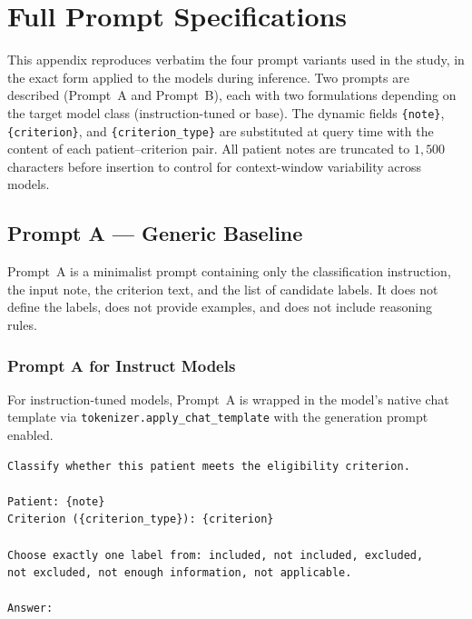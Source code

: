 
\chapter{Full Prompt Specifications}
\label{app:prompts}

This appendix reproduces verbatim the four prompt variants used in the 
study, in the exact form applied to the models during inference. Two 
prompts are described (Prompt~A and Prompt~B), each with two 
formulations depending on the target model class 
(instruction-tuned or base). The dynamic fields \texttt{\{note\}}, 
\texttt{\{criterion\}}, and \texttt{\{criterion\_type\}} are substituted 
at query time with the content of each patient--criterion pair. All 
patient notes are truncated to $1{,}500$ characters before insertion to 
control for context-window variability across models.

\section{Prompt A --- Generic Baseline}
\label{sec:app-prompt-a}

Prompt~A is a minimalist prompt containing only the classification 
instruction, the input note, the criterion text, and the list of 
candidate labels. It does not define the labels, does not provide 
examples, and does not include reasoning rules.

\subsection{Prompt A for Instruct Models}

For instruction-tuned models, Prompt~A is wrapped in the model's native 
chat template via \texttt{tokenizer.apply\_chat\_template} with the 
generation prompt enabled.

\begin{lstlisting}[caption={Prompt A for Instruct models (user 
    message before chat-template wrapping)}, 
    label={lst:prompt-a-instruct}, breaklines=true, basicstyle=\ttfamily\small]
Classify whether this patient meets the eligibility criterion.

Patient: {note}
Criterion ({criterion_type}): {criterion}

Choose exactly one label from: included, not included, excluded,
not excluded, not enough information, not applicable.

Answer:
\end{lstlisting}

